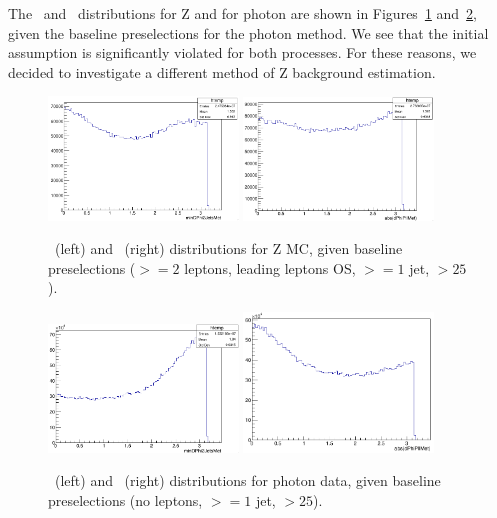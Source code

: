 The \mindphijm\ and \dphiptllmet\ distributions for Z and for photon are shown in Figures~\ref{fig:Z_distributions} and~\ref{fig:photon_distributions}, given the baseline preselections for the photon method. We see that the initial assumption is significantly violated for both processes. For these reasons, we decided to investigate a different method of Z background estimation.

\begin{figure}[hbtp]
    \centering
    \includegraphics[width=0.45\textwidth]{Images/SUSY/Z_dphijm.png}
    \includegraphics[width=0.45\textwidth]{Images/SUSY/Z_dphipm.png}
    \caption{\mindphijm\ (left) and \dphiptllmet\ (right) distributions for Z MC, given baseline preselections ($>=2$ leptons, leading leptons OS, $>=1$ jet, \ptll$>25$).}
    \label{fig:Z_distributions}
\end{figure}

\begin{figure}[hbtp]
    \centering
    \includegraphics[width=0.45\textwidth]{Images/SUSY/photon_dphijm.png}
    \includegraphics[width=0.45\textwidth]{Images/SUSY/photon_dphipm.png}
    \caption{\mindphijm\ (left) and \dphiptllmet\ (right) distributions for photon data, given baseline preselections (no leptons, $>=1$ jet, \ptll$>25$).}
    \label{fig:photon_distributions}
\end{figure}


